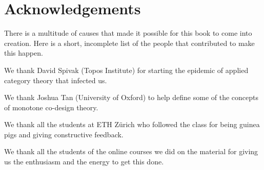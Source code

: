 
\section{Acknowledgements}

There is a multitude of causes that made it possible for this book to come into creation.
Here is a short, incomplete list of the people that contributed to make this happen.

We thank David Spivak (Topos Institute) for starting the epidemic of applied category theory that infected us.

We thank Joshua Tan (University of Oxford) to help define some of the concepts of monotone co-design theory.

We thank all the students at ETH Zürich who followed the class for being guinea pigs and giving constructive feedback.

We thank all the students of the online courses we did on the material for giving us the enthusiasm and the energy to get this done.

